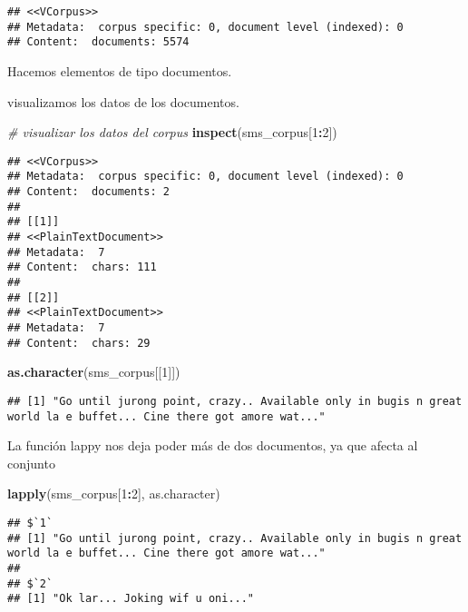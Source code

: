 \documentclass[]{article}
\newenvironment{Shaded}{\begin{snugshade}}{\end{snugshade}}
\newcommand{\KeywordTok}[1]{\textcolor[rgb]{0.13,0.29,0.53}{\textbf{#1}}}
\newcommand{\DecValTok}[1]{\textcolor[rgb]{0.00,0.00,0.81}{#1}}
\newcommand{\CommentTok}[1]{\textcolor[rgb]{0.56,0.35,0.01}{\textit{#1}}}
\newcommand{\OperatorTok}[1]{\textcolor[rgb]{0.81,0.36,0.00}{\textbf{#1}}}
\newcommand{\NormalTok}[1]{#1}
\begin{document}
\begin{verbatim}
## <<VCorpus>>
## Metadata:  corpus specific: 0, document level (indexed): 0
## Content:  documents: 5574
\end{verbatim}

Hacemos elementos de tipo documentos.

visualizamos los datos de los documentos.

\begin{Shaded}
\begin{Highlighting}[]
\CommentTok{# visualizar los datos del corpus}
\KeywordTok{inspect}\NormalTok{(sms_corpus[}\DecValTok{1}\OperatorTok{:}\DecValTok{2}\NormalTok{])}
\end{Highlighting}
\end{Shaded}

\begin{verbatim}
## <<VCorpus>>
## Metadata:  corpus specific: 0, document level (indexed): 0
## Content:  documents: 2
## 
## [[1]]
## <<PlainTextDocument>>
## Metadata:  7
## Content:  chars: 111
## 
## [[2]]
## <<PlainTextDocument>>
## Metadata:  7
## Content:  chars: 29
\end{verbatim}

\begin{Shaded}
\begin{Highlighting}[]
\KeywordTok{as.character}\NormalTok{(sms_corpus[[}\DecValTok{1}\NormalTok{]])}
\end{Highlighting}
\end{Shaded}

\begin{verbatim}
## [1] "Go until jurong point, crazy.. Available only in bugis n great world la e buffet... Cine there got amore wat..."
\end{verbatim}

La función lappy nos deja poder más de dos documentos, ya que afecta al
conjunto

\begin{Shaded}
\begin{Highlighting}[]
\KeywordTok{lapply}\NormalTok{(sms_corpus[}\DecValTok{1}\OperatorTok{:}\DecValTok{2}\NormalTok{], as.character)}
\end{Highlighting}
\end{Shaded}

\begin{verbatim}
## $`1`
## [1] "Go until jurong point, crazy.. Available only in bugis n great world la e buffet... Cine there got amore wat..."
## 
## $`2`
## [1] "Ok lar... Joking wif u oni..."
\end{verbatim}
\end{document}
